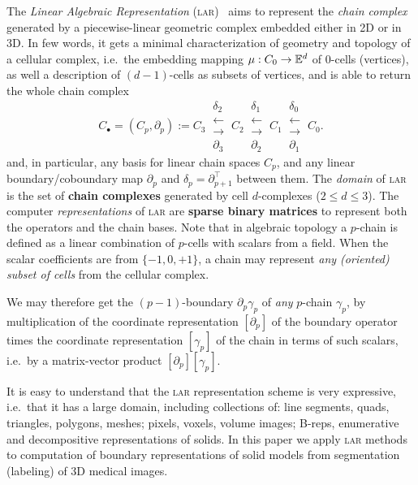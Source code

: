 The \emph{Linear Algebraic Representation} (\textsc{lar})~\cite{Dicarlo:2014:TNL:2543138.2543294} aims to represent the \emph{chain complex}~\cite{TSAS} generated by a piecewise-linear geometric complex embedded either in 2D or in 3D. In few words, it gets a minimal characterization of geometry and topology of a cellular complex, i.e.~the embedding mapping $\mu : C_0 \to \mathbb{E}^d$ of 0-cells (vertices), as well a description of $(d-1)$-cells as subsets of vertices, and is able to return the whole chain complex 
\[ 
C_\bullet = (C_p, \partial_p) := 
C_3 \ 
\substack{
\delta_2 \\
\longleftarrow \\[-1mm]
\longrightarrow \\
\partial_3 
}
\ C_2 \ 
\substack{
\delta_1 \\
\longleftarrow \\[-1mm]
\longrightarrow \\
\partial_2 
}
\ C_1 \ 
\substack{
\delta_0 \\
\longleftarrow \\[-1mm]
\longrightarrow \\
\partial_1 
}
\ C_0 .
\] 
and, in particular, any basis for linear chain spaces $C_p$, and any linear
boundary/coboundary map \(\partial_p\) and
\(\delta_p=\partial_{p+1}^\top\) between them. The \emph{domain} of \textsc{lar} is the set of \textbf{chain complexes} generated by cell $d$-complexes ($2\leq d\leq 3$). The computer \emph{representations} of \textsc{lar} are \textbf{sparse binary matrices} to represent both the operators and the chain bases. Note that in algebraic topology a $p$-chain is defined as a linear combination of $p$-cells with scalars from a field. When the scalar coefficients are from $\{-1, 0, +1\}$, a chain may represent \emph{any (oriented) subset of cells} from the cellular complex. 

We may therefore get the $(p-1)$-boundary $\partial_p \gamma_p$ of \emph{any} $p$-chain $\gamma_p$, by multiplication of the coordinate representation $[\partial_p]$ of the boundary operator times the coordinate representation $[\gamma_p]$ of the chain in terms of such scalars, i.e.~by a  matrix-vector product $ [\partial_p] [\gamma_p] $.

It is easy to understand that the \textsc{lar} representation scheme is very expressive, i.e.~that it  has a large domain,  including collections of: line segments, quads, triangles, polygons, meshes;  pixels, voxels, volume images; B-reps, enumerative and decompositive representations of solids. 
In this paper we apply \textsc{lar} methods to computation of boundary representations of solid models from segmentation (labeling) of 3D medical images.

